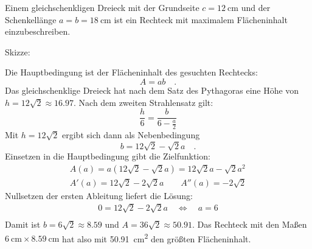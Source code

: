 \documentclass[auto-toc=false,babel=ngerman]{arbeitsblatt}
\begin{document}
\begin{question}
  Einem gleichschenkligen Dreieck mit der Grundseite $c=\SI{12}{\centi\metre}$
  und der Schenkellänge $a=b=\SI{18}{\centi\metre}$ ist ein Rechteck mit
  maximalem Flächeninhalt einzubeschreiben.
\end{question}
\begin{solution}
  Skizze:
  \begin{center}
  \end{center}
  Die Hauptbedingung ist der Flächeninhalt des gesuchten Rechtecks:
  \[ A = ab \quad. \]
  Das gleichschenklige Dreieck hat nach dem Satz des Pythagoras eine Höhe von
  $h=12\sqrt{2}\approx\num{16.97}$.  Nach dem zweiten Strahlensatz gilt:
  \[ \frac{h}{6} = \frac{b}{6-\frac{a}{2}} \] Mit $h=12\sqrt{2}$ ergibt sich
  dann als Nebenbedingung
  \[ b = 12\sqrt{2}-\sqrt{2}a \quad. \]
  Einsetzen in die Hauptbedingung gibt die Zielfunktion:
  \begin{gather*}
    A(a)   = a(12\sqrt{2}-\sqrt{2}a) = 12\sqrt{2}a-\sqrt{2}a^2 \\
    A'(a)  = 12\sqrt{2}-2\sqrt{2}a \qquad
    A''(a) = -2\sqrt{2}
  \end{gather*}
  Nullsetzen der ersten Ableitung liefert die Lösung:
  \begin{gather*}
    0 = 12\sqrt{2}-2\sqrt{2}a \quad\Leftrightarrow\quad
    a = 6 \\
  \end{gather*}
  Damit ist $b = 6\sqrt{2} \approx \num{8.59}$ und $A = 36\sqrt{2} \approx
  \num{50.91}$.  Das Rechteck mit den Maßen
  $\SI{6}{\centi\metre}\times\SI{8.59}{\centi\metre}$ hat also mit
  \SI{50.91}{\centi\metre\squared} den größten Flächeninhalt.
\end{solution}
\end{document}
